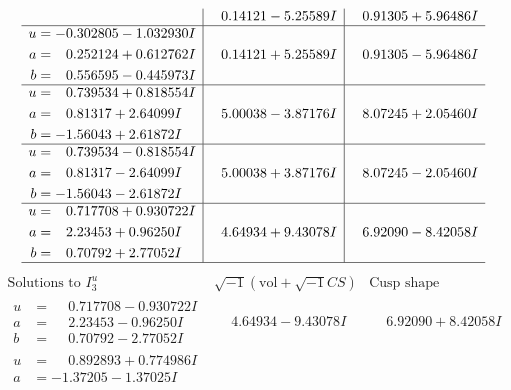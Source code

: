 \documentclass[1p]{elsarticle_modified}
\theoremstyle{definition}
\newcommand{\I}{\sqrt{-1}}
\begin{document}
$$\begin{array}{c|c|c}
 & \phantom{-}0.14121 - 5.25589 I & \phantom{-}0.91305 + 5.96486 I \\ \hline\begin{aligned}
u &= -0.302805 - 1.032930 I \\
a &= \phantom{-}0.252124 + 0.612762 I \\
b &= \phantom{-}0.556595 - 0.445973 I\end{aligned}
 & \phantom{-}0.14121 + 5.25589 I & \phantom{-}0.91305 - 5.96486 I \\ \hline\begin{aligned}
u &= \phantom{-}0.739534 + 0.818554 I \\
a &= \phantom{-}0.81317 + 2.64099 I \\
b &= -1.56043 + 2.61872 I\end{aligned}
 & \phantom{-}5.00038 - 3.87176 I & \phantom{-}8.07245 + 2.05460 I \\ \hline\begin{aligned}
u &= \phantom{-}0.739534 - 0.818554 I \\
a &= \phantom{-}0.81317 - 2.64099 I \\
b &= -1.56043 - 2.61872 I\end{aligned}
 & \phantom{-}5.00038 + 3.87176 I & \phantom{-}8.07245 - 2.05460 I \\ \hline\begin{aligned}
u &= \phantom{-}0.717708 + 0.930722 I \\
a &= \phantom{-}2.23453 + 0.96250 I \\
b &= \phantom{-}0.70792 + 2.77052 I\end{aligned}
 & \phantom{-}4.64934 + 9.43078 I & \phantom{-}6.92090 - 8.42058 I\\
 \hline 
 \end{array}$$\newpage$$\begin{array}{c|c|c}  
\text{Solutions to }I^u_{3}& \I (\text{vol} + \sqrt{-1}CS) & \text{Cusp shape}\\
 \hline 
\begin{aligned}
u &= \phantom{-}0.717708 - 0.930722 I \\
a &= \phantom{-}2.23453 - 0.96250 I \\
b &= \phantom{-}0.70792 - 2.77052 I\end{aligned}
 & \phantom{-}4.64934 - 9.43078 I & \phantom{-}6.92090 + 8.42058 I \\ \hline\begin{aligned}
u &= \phantom{-}0.892893 + 0.774986 I \\
a &= -1.37205 - 1.37025 I \\

\end{aligned}
\end{array}$$
\end{document}
